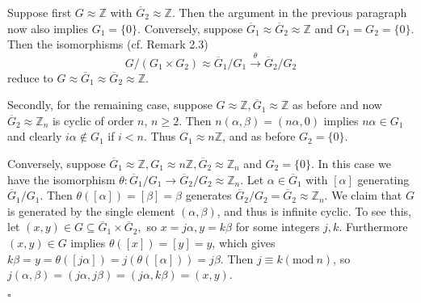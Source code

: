 \documentclass[11pt]{article}
\theoremstyle{change}
\newcommand{\<}{\langle}
\renewcommand{\>}{\rangle}
\newcommand{\qed}{\quad\hfill$\square$}
\begin{document}
Suppose first $G\approx \mathbb{Z}$ with $\overline{G}_2\approx \mathbb{Z}$. Then the argument in the previous paragraph now also implies $G_1=\{0\}$. Conversely, suppose $\overline{G}_1\approx \overline{G}_2\approx \mathbb{Z}$ and $G_1=G_2=\{0\}$. Then the isomorphisms (cf. Remark 2.3) 
$$G/(G_1\times G_2)\approx \overline{G}_1/G_1\xrightarrow{\theta} \overline{G}_2/G_2$$ reduce to $G\approx \overline{G}_1\approx \overline{G}_2\approx \mathbb{Z}$.

Secondly, for the remaining case, suppose $G\approx \mathbb{Z}, \overline{G}_1\approx \mathbb{Z}$ as before and now $\overline{G}_2\approx \mathbb{Z}_n$ is cyclic of order $n$, $n\geq 2$. Then $n(\alpha,\beta)=(n\alpha,0)$ implies $n\alpha\in G_1$ and clearly $i\alpha\notin G_1$ if $i<n$. Thus $G_1\approx n\mathbb{Z}$, and as before $G_2=\{0\}$.

Conversely, suppose $\overline{G}_1\approx \mathbb{Z},G_1\approx n\mathbb{Z},\overline{G}_2\approx \mathbb{Z}_n$ and $G_2=\{0\}$. In this case we have the isomorphism $\theta\colon \overline{G}_1/G_1\rightarrow \overline{G}_2/G_2\approx \mathbb{Z}_n$. Let $\alpha\in \overline{G}_1$ with $[\alpha]$ generating $\overline{G}_1/G_1$. Then $\theta([\alpha])=[\beta]=\beta$ generates $\overline{G}_2/G_2=\overline{G}_2\approx \mathbb{Z}_n$. We claim that $G$ is generated by the single element $(\alpha,\beta)$, and thus is infinite cyclic. To see this, let $(x,y)\in G\subseteq \overline{G}_1\times \overline{G}_2,$ so $x=j\alpha,y=k\beta$ for some integers $j,k$. Furthermore $(x,y)\in G$ implies $\theta([x])=[y]=y$, which gives $k\beta=y=\theta([j\alpha])=j(\theta([\alpha]))=j\beta$. Then $j\equiv k(\mbox{mod}~n)$, so $j(\alpha,\beta)=(j\alpha,j\beta)=(j\alpha,k\beta)=(x,y)$.


\qed
\end{document}
